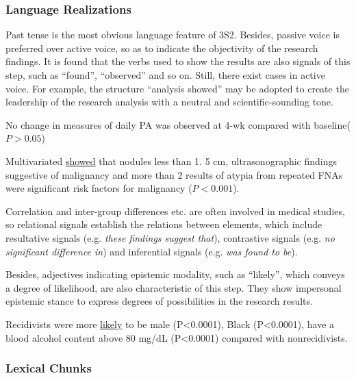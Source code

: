 \documentclass[a4paper]{ctexbook}
\begin{document}
    \subsubsection{Language Realizations}

    Past tense is the most obvious language feature of 3S2. Besides, passive voice is preferred over active voice, so as to indicate the objectivity of the research findings. It is found that the verbs used to show the results are also signals of this step, such as ``found'', ``observed'' and so on. Still, there exist cases in active voice. For example, the structure ``analysis showed'' may be adopted to create the leadership of the research analysis with a neutral and scientific-sounding tone.

    \begin{eg}{}
      No change in measures of daily PA was observed at 4-wk compared with baseline($P>0.05$)   
    \end{eg}

    \begin{eg}{}
      Multivariated  \uline{showed} that nodules less than 1. 5 cm, ultrasonographic findings suggestive of malignancy and more than 2 results of atypia from repeated FNAs were significant risk factors for malignancy ($P<0.001$).  
    \end{eg}

    Correlation and inter-group differences etc. are often involved in medical studies, so relational signals establish the relations between elements, which include resultative signals (e.g. \emph{these findings suggest that}), contrastive signals (e.g. \emph{no significant difference in}) and inferential signals (e.g. \emph{was found to be}).

    Besides, adjectives indicating epistemic modality, such as ``likely'', which conveys a degree of likelihood, are also characteristic of this step. They show impersonal epistemic stance to express degrees of possibilities in the research results.

    \begin{eg}{}
      Recidivists were more \uline{likely} to be male (P<0.0001), Black (P<0.0001), have a blood alcohol content above 80 mg/dL (P<0.0001) compared with nonrecidivists.  
    \end{eg}

    \subsubsection{Lexical Chunks}
\end{document}
